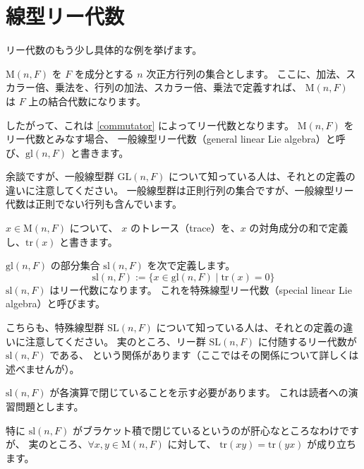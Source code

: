 \documentclass{ltjsarticle}
\begin{document}
\section{線型リー代数}

リー代数のもう少し具体的な例を挙げます。

\begin{usmexample}[一般線型リー代数]
    \(\mathrm{M}(n,F)\) を \(F\) を成分とする \(n\) 次正方行列の集合とします。
    ここに、加法、スカラー倍、乗法を、行列の加法、スカラー倍、乗法で定義すれば、
    \(\mathrm{M}(n,F)\) は \(F\) 上の結合代数になります。

    したがって、これは \autoref{commutator} によってリー代数となります。
    \(\mathrm{M}(n,F)\) をリー代数とみなす場合、
    一般線型リー代数（general linear Lie algebra）と呼び、\(\mathrm{gl}(n,F)\) と書きます。
\end{usmexample}

余談ですが、一般線型群 \(\mathrm{GL}(n,F)\) について知っている人は、それとの定義の違いに注意してください。
一般線型群は正則行列の集合ですが、一般線型リー代数は正則でない行列も含んでいます。

\begin{usmdefinition}[行列のトレース]
    \(x \in \mathrm{M}(n,F)\) について、
    \(x\) のトレース（trace）を、\(x\) の対角成分の和で定義し、\(\mathrm{tr}(x)\) と書きます。
\end{usmdefinition}

\begin{usmexample}[特殊線型リー代数]
    \(\mathrm{gl}(n,F)\) の部分集合 \(\mathrm{sl}(n,F)\) を次で定義します。
    \[
        \mathrm{sl}(n,F) := \{x \in \mathrm{gl}(n,F) \mid \mathrm{tr}(x) = 0\}
    \]
    \(\mathrm{sl}(n,F)\) はリー代数になります。
    これを特殊線型リー代数（special linear Lie algebra）と呼びます。
\end{usmexample}

こちらも、特殊線型群 \(\mathrm{SL}(n,F)\) について知っている人は、それとの定義の違いに注意してください。
実のところ、リー群 \(\mathrm{SL}(n,F)\) に付随するリー代数が \(\mathrm{sl}(n,F)\) である、
という関係があります（ここではその関係について詳しくは述べませんが）。

\begin{usmproof}
    \(\mathrm{sl}(n,F)\) が各演算で閉じていることを示す必要があります。
    これは読者への演習問題とします。
\end{usmproof}

特に \(\mathrm{sl}(n,F)\) がブラケット積で閉じているというのが肝心なところなわけですが、
実のところ、\(\forall x,y \in \mathrm{M}(n,F)\) に対して、
\(\mathrm{tr}(xy) = \mathrm{tr}(yx)\) が成り立ちます。
\end{document}
